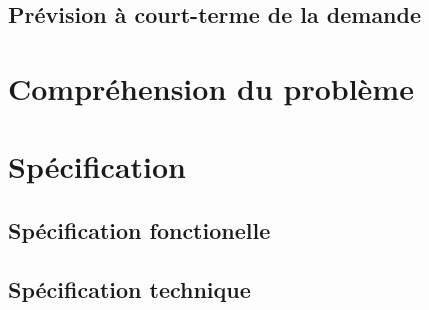 \subsection{Prévision à court-terme de la demande}
\section{Compréhension du problème}
\section{Spécification}
	\subsection{Spécification fonctionelle}
	\subsection{Spécification technique}